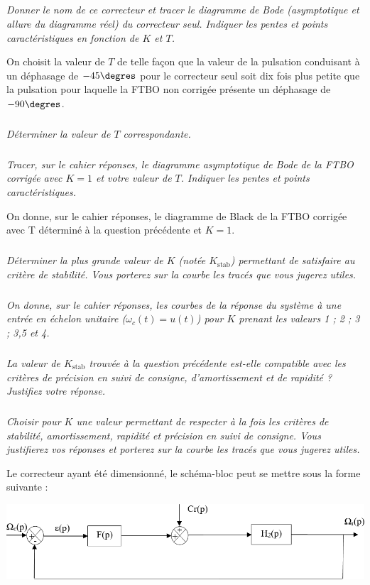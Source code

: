 \documentclass[10pt,fleqn]{article} %
\begin{document}
\begin{multicols}{2}
\subparagraph{}
\textit{Donner le nom de ce correcteur et tracer le diagramme de Bode (asymptotique et allure du diagramme réel) du correcteur seul. Indiquer les pentes et points caractéristiques en fonction de $K$ et $T$.}

On choisit la valeur de $T$ de telle façon que la valeur de la pulsation conduisant à un déphasage de $-45\degres$ pour le correcteur seul soit dix fois plus petite que la pulsation pour laquelle la FTBO non corrigée présente un déphasage de $-90\degres$.
\subparagraph{}
\textit{Déterminer la valeur de $T$ correspondante.}

\subparagraph{}
\textit{Tracer, sur le cahier réponses, le diagramme asymptotique de Bode de la FTBO corrigée avec $K = 1$ et votre valeur de $T$. Indiquer les pentes et points caractéristiques.}

On donne, sur le cahier réponses, le diagramme de Black de la FTBO corrigée avec T déterminé à la question précédente et $K = 1$.


\subparagraph{}
\textit{Déterminer la plus grande valeur de $K$ (notée $K_{\text{stab}}$) permettant de satisfaire au critère de stabilité. Vous porterez sur la courbe les tracés que vous jugerez utiles.}

\subparagraph{}
\textit{On donne, sur le cahier réponses, les courbes de la réponse du système à une entrée en échelon unitaire ($\omega_c(t) = u(t)$) pour $K$ prenant les valeurs 1 ; 2 ; 3 ; 3,5 et 4.}


\subparagraph{}
\textit{La valeur de $K_{\text{stab}}$ trouvée à la question précédente est-elle compatible avec les critères de précision en suivi de consigne, d'amortissement et de rapidité ? Justifiez votre réponse.}

\subparagraph{}
\textit{Choisir pour $K$ une valeur permettant de respecter à la fois les critères de stabilité, amortissement, rapidité et précision en suivi de consigne. Vous justifierez vos réponses et porterez sur la courbe les tracés que vous jugerez utiles.}

 
Le correcteur ayant été dimensionné, le schéma-bloc peut se mettre sous la forme suivante :
\begin{center}
\includegraphics[width=.8\linewidth]{images/e3a_09.png}
\end{center}


\end{multicols}
\end{document}

